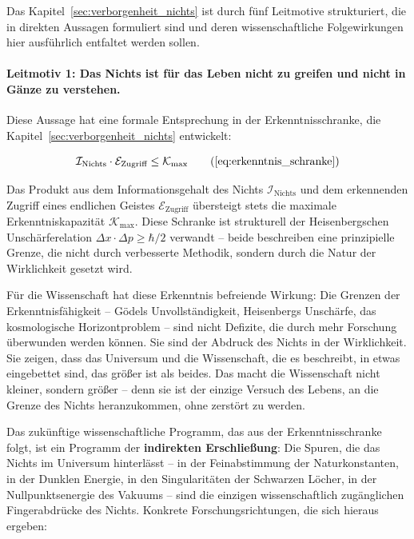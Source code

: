 ﻿\documentclass[12pt,a4paper]{report}
\begin{document}
Das Kapitel~\ref{sec:verborgenheit_nichts} ist durch fünf Leitmotive strukturiert, die in direkten Aussagen formuliert sind und deren wissenschaftliche Folgewirkungen hier ausführlich entfaltet werden sollen.

\paragraph{Leitmotiv 1: Das Nichts ist für das Leben nicht zu greifen und nicht in Gänze zu verstehen.}

Diese Aussage hat eine formale Entsprechung in der Erkenntnisschranke, die Kapitel~\ref{sec:verborgenheit_nichts} entwickelt:

\begin{equation}
	\mathcal{I}_{\text{Nichts}} \cdot \mathcal{E}_{\text{Zugriff}} \leq \mathcal{K}_{\max}
	\tag{\ref{eq:erkenntnis_schranke}}
\end{equation}

Das Produkt aus dem Informationsgehalt des Nichts $\mathcal{I}_{\text{Nichts}}$ und dem erkennenden Zugriff eines endlichen Geistes $\mathcal{E}_{\text{Zugriff}}$ übersteigt stets die maximale Erkenntniskapazität $\mathcal{K}_{\max}$. Diese Schranke ist strukturell der Heisenbergschen Unschärferelation $\Delta x \cdot \Delta p \geq \hbar/2$ verwandt -- beide beschreiben eine prinzipielle Grenze, die nicht durch verbesserte Methodik, sondern durch die Natur der Wirklichkeit gesetzt wird.

Für die Wissenschaft hat diese Erkenntnis befreiende Wirkung: Die Grenzen der Erkenntnisfähigkeit -- Gödels Unvollständigkeit, Heisenbergs Unschärfe, das kosmologische Horizontproblem -- sind nicht Defizite, die durch mehr Forschung überwunden werden können. Sie sind der Abdruck des Nichts in der Wirklichkeit. Sie zeigen, dass das Universum und die Wissenschaft, die es beschreibt, in etwas eingebettet sind, das größer ist als beides. Das macht die Wissenschaft nicht kleiner, sondern größer -- denn sie ist der einzige Versuch des Lebens, an die Grenze des Nichts heranzukommen, ohne zerstört zu werden.

Das zukünftige wissenschaftliche Programm, das aus der Erkenntnisschranke folgt, ist ein Programm der \textbf{indirekten Erschließung}: Die Spuren, die das Nichts im Universum hinterlässt -- in der Feinabstimmung der Naturkonstanten, in der Dunklen Energie, in den Singularitäten der Schwarzen Löcher, in der Nullpunktsenergie des Vakuums -- sind die einzigen wissenschaftlich zugänglichen Fingerabdrücke des Nichts. Konkrete Forschungsrichtungen, die sich hieraus ergeben:
\end{document}
